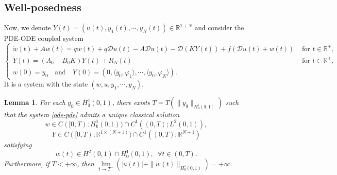 \documentclass[review]{elsarticle}
\newtheorem{lemma}[theorem]{Lemma}
\numberwithin{equation}{section}
\begin{document}
\subsection{Well-posedness}
    Now, we denote $Y(t)=(u(t),y_1(t),\cdots,y_N(t))\in\mathbb{R}^{1+N}$ and consider the PDE-ODE coupled system    
\begin{equation}
    \label{ode-pde}
    \left\{\begin{array}{ll}
 \dot{w}(t)+A w (t)=q w(t)+q\mathcal{D} u(t)-A \mathcal{D} u(t)-\mathcal{D} (KY(t))+f\left(\mathcal{D}u(t)+w(t)\right)&\text{ for } t\in \mathbb{R}^+,\\[2mm]
\dot{Y}(t)=(A_0+B_0K)Y(t)+R_N(t)&\text{ for } t\in \mathbb{R}^+,\\[2mm]
w(0 )=y_0\quad \text{and} \quad Y(0)=(0,\langle y_0,\varphi_1\rangle,\cdots,\langle y_0,\varphi_N\rangle).
\end{array}\right.
\end{equation}
It is a system with the state \((w, u, y_1,\cdots,y_N)\).
\begin{lemma}
    For each $y_0\in H^1_0(0,1)$, there exists $T=T\left(\|y_0\|_{H^1_0(0,1)}\right)$ such that the system \eqref{ode-pde} admits a unique classical solution $$
    w\in C([0,T);H^1_0(0,1))\cap C^1((0,T);L^2(0,1)),$$ $$Y\in C([0,T);\mathbb{R}^{1\times (N+1)})\cap C^1((0,T);\mathbb{R}^{N+1})$$ satisfying $$w(t)\in H^2(0,1)\cap H^1_0(0,1),\;\; \forall t\in(0,T).$$ Furthermore, if $T<+\infty$, then $\lim\limits_{t\to T^-}(|u(t)|+\|w(t)\|_{H^1_0(0,1)})=+\infty$.
\end{lemma}
\end{document}

